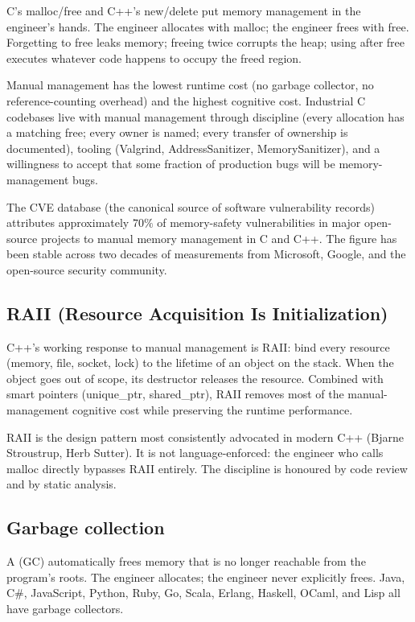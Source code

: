 C's malloc/free and C++'s new/delete put memory management in the engineer's hands. The engineer allocates with malloc; the engineer frees with free. Forgetting to free leaks memory; freeing twice corrupts the heap; using after free executes whatever code happens to occupy the freed region.

Manual management has the lowest runtime cost (no garbage collector, no reference-counting overhead) and the highest cognitive cost. Industrial C codebases live with manual management through discipline (every allocation has a matching free; every owner is named; every transfer of ownership is documented), tooling (Valgrind, AddressSanitizer, MemorySanitizer), and a willingness to accept that some fraction of production bugs will be memory-management bugs.

The CVE database (the canonical source of software vulnerability records) attributes approximately $70\%$ of memory-safety vulnerabilities in major open-source projects to manual memory management in C and C++. The figure has been stable across two decades of measurements from Microsoft, Google, and the open-source security community.

\subsection{RAII (Resource Acquisition Is Initialization)}

C++'s working response to manual management is RAII: bind every resource (memory, file, socket, lock) to the lifetime of an object on the stack. When the object goes out of scope, its destructor releases the resource. Combined with smart pointers (unique\_ptr, shared\_ptr), RAII removes most of the manual-management cognitive cost while preserving the runtime performance.

RAII is the design pattern most consistently advocated in modern C++ (Bjarne Stroustrup, Herb Sutter). It is not language-enforced: the engineer who calls malloc directly bypasses RAII entirely. The discipline is honoured by code review and by static analysis.

\subsection{Garbage collection}

A  (GC) automatically frees memory that is no longer reachable from the program's roots. The engineer allocates; the engineer never explicitly frees. Java, C\#, JavaScript, Python, Ruby, Go, Scala, Erlang, Haskell, OCaml, and Lisp all have garbage collectors.

